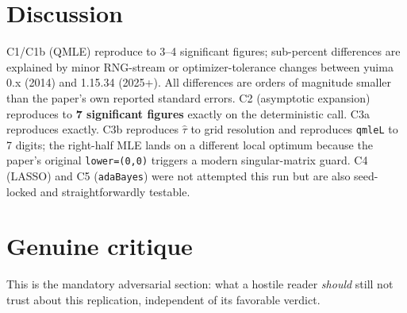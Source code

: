 \documentclass[11pt]{article}
\begin{document}
\section{Discussion}

C1/C1b (QMLE) reproduce to 3--4 significant figures; sub-percent
differences are explained by minor RNG-stream or optimizer-tolerance
changes between yuima 0.x (2014) and 1.15.34 (2025+). All differences
are orders of magnitude smaller than the paper's own reported standard
errors. C2 (asymptotic expansion) reproduces to \textbf{7 significant
figures} exactly on the deterministic call. C3a reproduces exactly. C3b
reproduces $\hat\tau$ to grid resolution and reproduces \texttt{qmleL}
to 7 digits; the right-half MLE lands on a different local optimum
because the paper's original \texttt{lower=(0,0)} triggers a modern
singular-matrix guard. C4 (LASSO) and C5 (\texttt{adaBayes}) were not
attempted this run but are also seed-locked and straightforwardly
testable.

\section{Genuine critique}

This is the mandatory adversarial section: what a hostile reader
\emph{should} still not trust about this replication, independent of
its favorable verdict.
\end{document}
